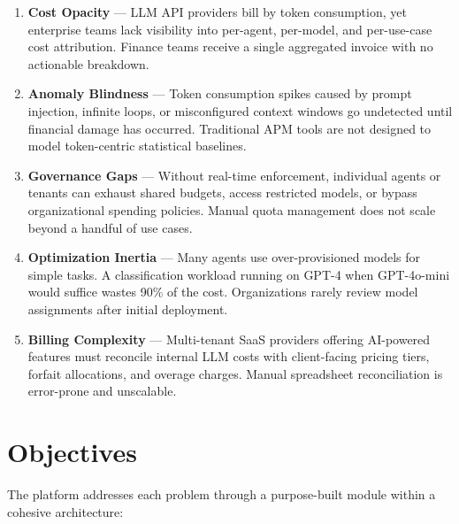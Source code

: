 \documentclass[12pt,a4paper,twoside]{report}
\begin{document}
\begin{enumerate}[label=\textbf{P\arabic*.}, leftmargin=2cm]
  \item \textbf{Cost Opacity} — LLM API providers bill by token consumption, yet enterprise teams lack visibility into per-agent, per-model, and per-use-case cost attribution. Finance teams receive a single aggregated invoice with no actionable breakdown.

  \item \textbf{Anomaly Blindness} — Token consumption spikes caused by prompt injection, infinite loops, or misconfigured context windows go undetected until financial damage has occurred. Traditional APM tools are not designed to model token-centric statistical baselines.

  \item \textbf{Governance Gaps} — Without real-time enforcement, individual agents or tenants can exhaust shared budgets, access restricted models, or bypass organizational spending policies. Manual quota management does not scale beyond a handful of use cases.

  \item \textbf{Optimization Inertia} — Many agents use over-provisioned models for simple tasks. A classification workload running on GPT-4 when GPT-4o-mini would suffice wastes 90\% of the cost. Organizations rarely review model assignments after initial deployment.

  \item \textbf{Billing Complexity} — Multi-tenant SaaS providers offering AI-powered features must reconcile internal LLM costs with client-facing pricing tiers, forfait allocations, and overage charges. Manual spreadsheet reconciliation is error-prone and unscalable.
\end{enumerate}

\section{Objectives}

The platform addresses each problem through a purpose-built module within a cohesive architecture:
\end{document}
